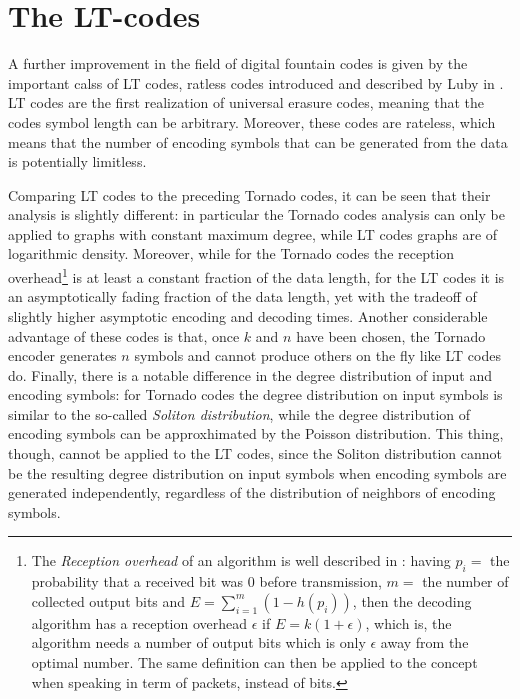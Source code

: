 \section{The LT-codes}
\label{sec:lt}
A further improvement in the field of digital fountain codes is given by the important calss of LT codes, ratless codes introduced and described by Luby in \cite{Luby}. LT codes are the first realization of universal erasure codes, meaning that the codes symbol length can be arbitrary. Moreover, these codes are rateless, which means that the number of encoding symbols that can be generated from the data is potentially limitless.

Comparing LT codes to the preceding Tornado codes, it can be seen that their analysis is slightly different: in particular the Tornado codes analysis can only be applied to graphs with constant maximum degree, while LT codes graphs are of logarithmic density. Moreover, while for the Tornado codes the reception overhead\footnote{The \textit{Reception overhead} of an algorithm is well described in \cite{Etesami2006}: having $p_i = $ the probability that a received bit was $0$ before transmission, $m =$ the number of collected output bits and $E = \sum_{i=1}^m(1-h(p_i))$, then the decoding algorithm has a reception overhead $\epsilon$ if $E = k(1+\epsilon)$, which is, the algorithm needs a number of output bits which is only $\epsilon$ away from the optimal number. The same definition can then be applied to the concept when speaking in term of packets, instead of bits.} is at least a constant fraction of the data length, for the LT codes it is an asymptotically fading fraction of the data length, yet with the tradeoff of slightly higher asymptotic encoding and decoding times. Another considerable advantage of these codes is that, once $k$ and $n$ have been chosen, the Tornado encoder generates $n$ symbols and cannot produce others on the fly like LT codes do. Finally, there is a notable difference in the degree distribution of input and encoding symbols: for Tornado codes the degree distribution on input symbols is similar to the so-called \textit{Soliton distribution}, while the degree distribution of encoding symbols can be approxhimated by the Poisson distribution. This thing, though, cannot be applied to the LT codes, since the Soliton distribution cannot be the resulting degree distribution on input symbols when encoding symbols are generated independently, regardless of the distribution of neighbors of encoding symbols.
\cite{Luby}

